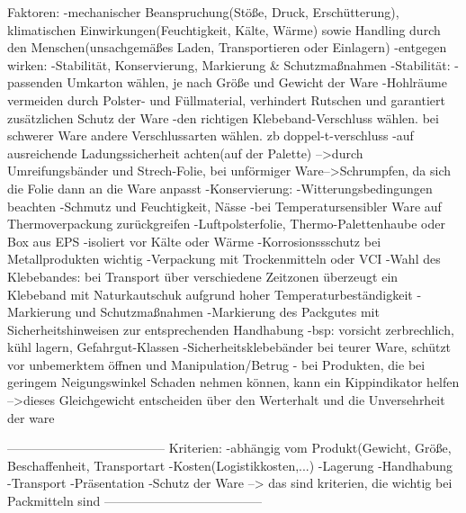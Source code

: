     Faktoren:
        -mechanischer Beanspruchung(Stöße, Druck, Erschütterung), klimatischen Einwirkungen(Feuchtigkeit, Kälte, Wärme) sowie Handling durch den Menschen(unsachgemäßes Laden, Transportieren oder Einlagern)
        -entgegen wirken: 
            -Stabilität, Konservierung, Markierung \& Schutzmaßnahmen
                -Stabilität: 
                    -passenden Umkarton wählen, je nach Größe und Gewicht der Ware
                    -Hohlräume vermeiden durch Polster- und Füllmaterial, verhindert Rutschen und garantiert zusätzlichen Schutz der Ware
                    -den richtigen Klebeband-Verschluss wählen. bei schwerer Ware andere Verschlussarten wählen. zb doppel-t-verschluss
                    -auf ausreichende Ladungssicherheit achten(auf der Palette)
                        -->durch Umreifungsbänder und Strech-Folie, bei unförmiger Ware-->Schrumpfen, da sich die Folie dann an die Ware anpasst
                -Konservierung:
                    -Witterungsbedingungen beachten
                        -Schmutz und Feuchtigkeit, Nässe
                    -bei Temperatursensibler Ware auf Thermoverpackung zurückgreifen
                        -Luftpolsterfolie, Thermo-Palettenhaube oder Box aus EPS
                            -isoliert vor Kälte oder Wärme
                        -Korrosionssschutz bei Metallprodukten wichtig
                            -Verpackung mit Trockenmitteln oder VCI
                        -Wahl des Klebebandes: bei Transport über verschiedene Zeitzonen überzeugt ein Klebeband mit Naturkautschuk aufgrund hoher Temperaturbeständigkeit
                -Markierung und Schutzmaßnahmen
                    -Markierung des Packgutes mit Sicherheitshinweisen zur entsprechenden Handhabung
                        -bsp: vorsicht zerbrechlich, kühl lagern, Gefahrgut-Klassen
                    -Sicherheitsklebebänder bei teurer Ware, schützt vor unbemerktem öffnen und Manipulation/Betrug
                    - bei Produkten, die bei geringem Neigungswinkel Schaden nehmen können, kann ein Kippindikator helfen
        -->dieses Gleichgewicht entscheiden über den Werterhalt und die Unversehrheit der ware  

--------------------------------------
        Kriterien:  -abhängig vom Produkt(Gewicht, Größe, Beschaffenheit, Transportart
                    -Kosten(Logistikkosten,...)
                    -Lagerung
                    -Handhabung
                    -Transport
                    -Präsentation
                    -Schutz der Ware
             --> das sind kriterien, die wichtig bei Packmitteln sind       
--------------------------------------


